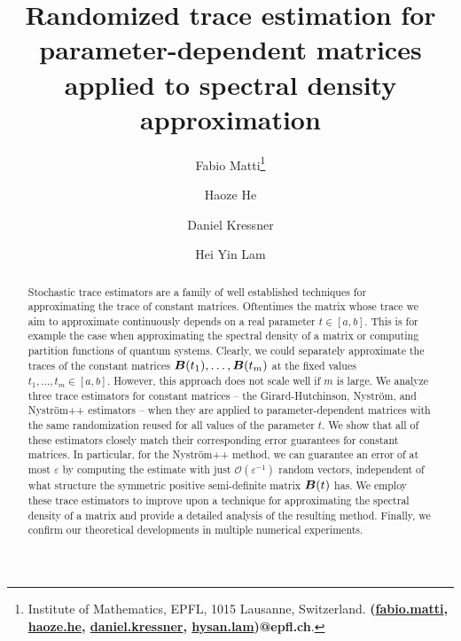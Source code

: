 \documentclass[11pt]{article}
\title{Randomized trace estimation for parameter-dependent matrices applied to spectral density approximation}
\author{Fabio Matti\thanks{Institute of Mathematics, EPFL, 1015 Lausanne, Switzerland. {\textbf{(\href{mailto:fabio.matti@epfl.ch}{fabio.matti}, \href{mailto:haoze.he@epfl.ch}{haoze.he}, \href{mailto:daniel.kressner@epfl.ch}{daniel.kressner}, \href{mailto:hysan.lam@epfl.ch}{hysan.lam})@epfl.ch}}.}
\and Haoze He\footnotemark[1]
\and Daniel Kressner\footnotemark[1]
\and Hei Yin Lam\footnotemark[1]}
\begin{document}
\maketitle



\begin{abstract}
    Stochastic trace estimators are a family of well established techniques for approximating the trace of constant matrices. Oftentimes the matrix whose trace we aim to approximate continuously depends on a real parameter $t \in [a,b]$. This is for example the case when approximating the spectral density of a matrix or computing partition functions of quantum systems. Clearly, we could separately approximate the traces of the constant matrices $\boldsymbol{B}(t_1), \dots, \boldsymbol{B}(t_m)$ at the fixed values $t_1, \dots, t_m \in [a, b]$. However, this approach does not scale well if $m$ is large. We analyze three trace estimators for constant matrices -- the Girard-Hutchinson, Nyström, and Nyström++ estimators -- when they are applied to parameter-dependent matrices with the same randomization reused for all values of the parameter $t$. We show that all of these estimators closely match their corresponding error guarantees for constant matrices. In particular, for the Nyström++ method, we can guarantee an error of at most $\varepsilon$ by computing the estimate with just $\mathcal{O}(\varepsilon^{-1})$ random vectors, independent of what structure the symmetric positive semi-definite matrix $\boldsymbol{B}(t)$ has. We employ these trace estimators to improve upon a technique for approximating the spectral density of a matrix and provide a detailed analysis of the resulting method. Finally, we confirm our theoretical developments in multiple numerical experiments.
\end{abstract}
\end{document}
